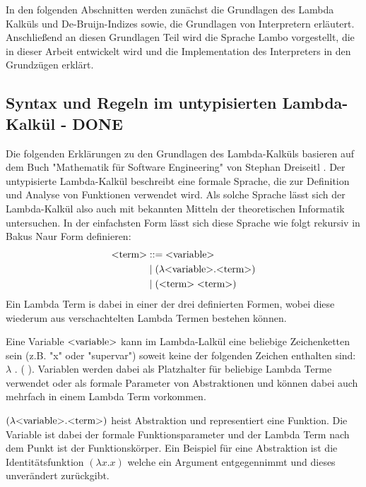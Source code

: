 \documentclass[ngerman]{article}
\begin{document}
In den folgenden Abschnitten werden zunächst die Grundlagen des Lambda Kalküls und De-Bruijn-Indizes sowie, die Grundlagen von Interpretern erläutert. Anschließend an diesen Grundlagen Teil wird die Sprache Lambo vorgestellt, die in dieser Arbeit entwickelt wird und die Implementation des Interpreters in den Grundzügen erklärt.

\subsection{Syntax und Regeln im untypisierten Lambda-Kalkül - DONE}

Die folgenden Erklärungen zu den Grundlagen des Lambda-Kalküls basieren auf dem Buch "Mathematik für Software Engineering" von Stephan Dreiseitl \cite*{Dreiseitl2018}.
Der untypisierte Lambda-Kalkül beschreibt eine formale Sprache, die zur Definition und Analyse von Funktionen verwendet wird. Als solche Sprache lässt sich der Lambda-Kalkül also auch mit bekannten Mitteln der theoretischen Informatik untersuchen. 
In der einfachsten Form lässt sich diese Sprache wie folgt rekursiv in Bakus Naur Form definieren:
\begin{align*}
    \text{\textless term\textgreater} & ::= \text{\textless variable\textgreater} \\
                      & \; | \; ( \lambda \text{\textless variable\textgreater} . \text{\textless term\textgreater} )\\
                      & \; | \; (\text{\textless term\textgreater} \; \text{\textless term\textgreater})
\end{align*}
Ein Lambda Term is dabei in einer der drei definierten Formen, wobei diese wiederum aus verschachtelten Lambda Termen bestehen können.

Eine Variable $\text{\textless variable\textgreater}$ kann im Lambda-Lalkül eine beliebige Zeichenketten sein (z.B. "x" oder "supervar") soweit keine der folgenden Zeichen enthalten sind: $\lambda$ . ( ). Variablen werden dabei als Platzhalter für beliebige Lambda Terme verwendet oder als formale Parameter von Abstraktionen und können dabei auch mehrfach in einem Lambda Term vorkommen.

$(\lambda \text{\textless variable\textgreater} . \text{\textless term\textgreater})$ heist Abstraktion und representiert eine Funktion. Die Variable ist dabei der formale Funktionsparameter und der Lambda Term nach dem Punkt ist der Funktionskörper. Ein Beispiel für eine Abstraktion ist die Identitätsfunktion $(\lambda x.x)$ welche ein Argument entgegennimmt und dieses unverändert zurückgibt.
\end{document}
